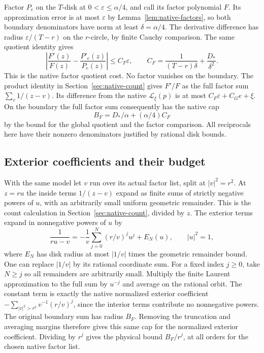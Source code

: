 \documentclass[11pt]{amsart}
\theoremstyle{definition}
\theoremstyle{remark}
\numberwithin{equation}{section}
\begin{document}
Factor $P_e$ on the $T$-disk at $0<\varepsilon\le\alpha/4$,
and call its factor polynomial $F$. Its approximation error
is at most $\varepsilon$ by Lemma~\ref{lem:native-factors},
so both boundary denominators have norm at least
$\delta=\alpha/4$. The derivative difference has radius
$\varepsilon/(T-r)$ on the $r$-circle, by finite Cauchy
comparison. The same quotient identity gives
\[
 \left|\frac{F'(z)}{F(z)}-\frac{P'_e(z)}{P_e(z)}\right|
 \le C_F\varepsilon,\qquad
 C_F=\frac1{(T-r)\delta}+\frac{D_*}{\delta^2}.
\]
This is the native factor quotient cost.
No factor vanishes on the boundary. The product identity
in Section~\ref{sec:native-count} gives $F'/F$ as the
full factor sum $\sum_v 1/(z-v)$. Its difference from
the native $\mathcal L_\xi(p)$ is at most
$C_F\varepsilon+C_G e+\xi$.
On the boundary the full factor sum consequently has
the native cap
\[
           B_F=D_*/\alpha+(\alpha/4) C_F
\]
by the bound for the global quotient and the factor
comparison. All reciprocals here have their nonzero
denominators justified by rational disk bounds.

\subsection{Exterior coefficients and their budget}

With the same model let $v$ run over its actual
factor list, split at $|v|^2=r^2$. At $z=ru$ the
inside terms $1/(z-v)$ expand as finite sums of strictly
negative powers of $u$, with an arbitrarily small
uniform geometric remainder. This is the count
calculation in Section~\ref{sec:native-count}, divided
by $z$. The exterior terms expand in nonnegative powers
of $u$ by
\[
       \frac{1}{ru-v}=-\frac1v\sum_{j=0}^N (r/v)^j u^j
                        +E_N(u),\qquad |u|^2=1 ,
\]
where $E_N$ has disk radius at most
$|1/v|$ times the geometric remainder bound.
One can replace $|1/v|$ by its rational coordinate sum.
For a fixed index $j\ge0$, take $N\ge j$ so all
remainders are arbitrarily small. Multiply the finite
Laurent approximation to the full sum by $u^{-j}$
and average on the rational orbit. The constant term
is exactly the native normalized exterior coefficient
$-\sum_{|v|^2>r^2}v^{-1}(r/v)^j$, since the interior
terms contribute no nonnegative powers.
The original boundary sum has radius $B_F$. Removing
the truncation and averaging margins therefore gives
this same cap for the normalized exterior coefficient.
Dividing by $r^j$ gives the physical bound $B_F/r^j$,
at all orders for the chosen native factor list.
\end{document}
